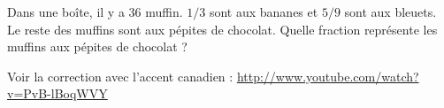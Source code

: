
\begin{exercice}\label{exo2smath-0027}

    Dans une boîte, il y a \( 36\) muffin. \( 1/3\) sont aux bananes et \( 5/9\) sont aux bleuets. Le reste des muffins sont aux pépites de chocolat. Quelle fraction représente les muffins aux pépites de chocolat ?

    {\tiny
Voir la correction avec l'accent canadien : \url{http://www.youtube.com/watch?v=PvB-lBoqWVY}
}

\end{exercice}
